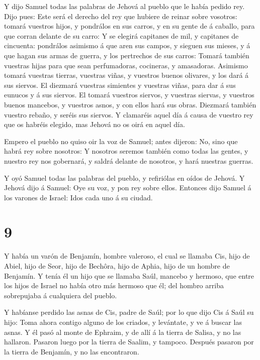  Y dijo Samuel todas las palabras de Jehová al pueblo que
le había pedido rey.  Dijo pues: Este será el derecho del
rey que hubiere de reinar sobre vosotros: tomará vuestros hijos, y
pondrálos en sus carros, y en su gente de á caballo, para que corran
delante de su carro:  Y se elegirá capitanes de mil, y
capitanes de cincuenta: pondrálos asimismo á que aren sus campos, y
sieguen sus mieses, y á que hagan sus armas de guerra, y los pertrechos
de sus carros:  Tomará también vuestras hijas para que sean
perfumadoras, cocineras, y amasadoras.  Asimismo tomará
vuestras tierras, vuestras viñas, y vuestros buenos olivares, y los dará
á sus siervos.  El diezmará vuestras simientes y vuestras
viñas, para dar á sus eunucos y á sus siervos.  El tomará
vuestros siervos, y vuestras siervas, y vuestros buenos mancebos, y
vuestros asnos, y con ellos hará sus obras.  Diezmará
también vuestro rebaño, y seréis sus siervos.  Y clamaréis
aquel día á causa de vuestro rey que os habréis elegido, mas Jehová no
os oirá en aquel día.

 Empero el pueblo no quiso oir la voz de Samuel; antes
dijeron: No, sino que habrá rey sobre nosotros:  Y nosotros
seremos también como todas las gentes, y nuestro rey nos gobernará, y
saldrá delante de nosotros, y hará nuestras guerras.

 Y oyó Samuel todas las palabras del pueblo, y refiriólas
en oídos de Jehová.  Y Jehová dijo á Samuel: Oye su voz, y
pon rey sobre ellos. Entonces dijo Samuel á los varones de Israel: Idos
cada uno á su ciudad.

\hypertarget{section-8}{%
\section{9}\label{section-8}}

 Y había un varón de Benjamín, hombre valeroso, el cual se
llamaba Cis, hijo de Abiel, hijo de Seor, hijo de Bechôra, hijo de
Aphia, hijo de un hombre de Benjamín.  Y tenía él un hijo
que se llamaba Saúl, mancebo y hermoso, que entre los hijos de Israel no
había otro más hermoso que él; del hombro arriba sobrepujaba á
cualquiera del pueblo.

 Y habíanse perdido las asnas de Cis, padre de Saúl; por lo
que dijo Cis á Saúl su hijo: Toma ahora contigo alguno de los criados, y
levántate, y ve á buscar las asnas.  Y él pasó al monte de
Ephraim, y de allí á la tierra de Salisa, y no las hallaron. Pasaron
luego por la tierra de Saalim, y tampoco. Después pasaron por la tierra
de Benjamín, y no las encontraron.

